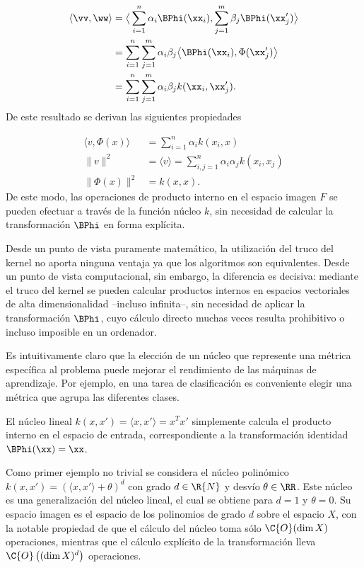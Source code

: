 \begin{align}
  \langle \vv,\ww\rangle&=\big\langle\sum_{i=1}^{n}\alpha_i\BPhi(\xx_i),
      \sum_{j=1}^{m}\beta_j\BPhi(\xx_j')\big\rangle \notag\\
    &=\sum_{i=1}^{n}\sum_{j=1}^{m}
      \alpha_i\beta_j\big\langle\BPhi(\xx_i),\Phi(\xx_j')\big\rangle\notag\\
    &=\sum_{i=1}^{n}\sum_{j=1}^{m} \alpha_i\beta_jk(\xx_i,\xx_j').
\end{align}
De este resultado se derivan las siguientes propiedades

\begin{align}
  \langle{}v,\Phi(x)\rangle &= \sum_{i=1}^{n}\alpha_ik(x_i,x) \\
  \|v\|^2 &= \langle{}v\rangle=\sum_{i,j=1}^n\alpha_i\alpha_jk(x_i,x_j)\\
  \|\Phi(x)\|^2 &=k(x,x).
\end{align}
De este modo, las operaciones de producto interno en el espacio imagen
$F$ se pueden efectuar a través de la función núcleo $k$, sin necesidad
de calcular la transformación $\BPhi$ en forma explícita.

Desde un punto de vista puramente matemático, la utilización del truco
del kernel no aporta ninguna ventaja ya que los algoritmos son
equivalentes. Desde un punto de vista computacional, sin embargo, la
diferencia es decisiva: mediante el truco del kernel se pueden
calcular productos internos en espacios vectoriales de alta
dimensionalidad --incluso infinita--, sin necesidad de aplicar la
transformación $\BPhi$, cuyo cálculo directo muchas veces resulta
prohibitivo o incluso imposible en un ordenador.

Es intuitivamente claro que la elección de un núcleo que represente
una métrica específica al problema puede mejorar el rendimiento de las
máquinas de aprendizaje. Por ejemplo, en una tarea de clasificación es
conveniente elegir una métrica que agrupa las diferentes clases.

El núcleo lineal $k(x,x')=\langle{}x,x'\rangle=x^Tx'$ simplemente
calcula el producto interno en el espacio de entrada, correspondiente
a la transformación identidad $\BPhi(\xx)=\xx$.

Como primer ejemplo no trivial se considera el núcleo polinómico
$k(x,x')=\left(\langle{}x,x'\rangle+\theta\right)^d$ con grado
$d\in\R{N}$ y desvío $\theta\in\RR$. Este núcleo es una generalización
del núcleo lineal, el cual se obtiene para $d=1$ y $\theta=0$. Su
espacio imagen es el espacio de los polinomios de grado
$d$ sobre el espacio $X$, con la notable propiedad de que
el cálculo del núcleo toma sólo $\C{O}(\dim{}X)$ operaciones,
mientras que el cálculo explícito de la transformación
lleva 
$\C{O}\left((\dim{}X)^d\right)$ operaciones.

